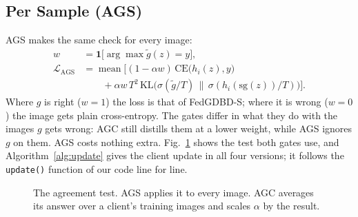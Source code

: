 \documentclass[conference]{IEEEtran}
\begin{document}
\subsection{Per Sample (AGS)}
AGS makes the same check for every image:
\begin{equation}
\begin{aligned}
w &= \mathbf{1}\big[\arg\max \tilde{g}(z) = y\big],\\
\mathcal{L}_{\text{AGS}} &= \operatorname{mean}\Big[(1-\alpha w)\,\mathrm{CE}\big(h_i(z),y\big)\\
&\qquad + \alpha w\, T^2\,\mathrm{KL}\big(\sigma(\tilde{g}/T)\,\|\,\sigma(h_i(\mathrm{sg}(z))/T)\big)\Big].
\end{aligned}
\label{eq:ags}
\end{equation}
Where $g$ is right ($w=1$) the loss is that of FedGDBD-S; where it is wrong ($w=0$) the image gets plain cross-entropy. The gates differ in what they do with the images $g$ gets wrong: AGC still distills them at a lower weight, while AGS ignores $g$ on them. AGS costs nothing extra. Fig.~\ref{fig:gate} shows the test both gates use, and Algorithm~\ref{alg:update} gives the client update in all four versions; it follows the \texttt{update()} function of our code line for line.

\begin{figure}[t]
\centering
{}
\caption{The agreement test. AGS applies it to every image. AGC averages its answer over a client's training images and scales $\alpha$ by the result.}
\label{fig:gate}
\end{figure}
\end{document}
